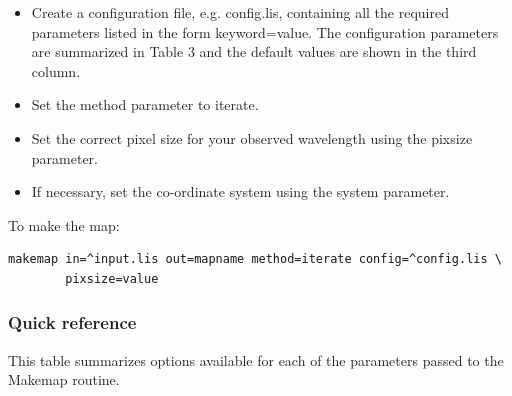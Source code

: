 \documentclass[twoside,11pt]{article}
\renewcommand{\_}{\texttt{\symbol{95}}}
\begin{document}
\begin{itemize}
\item Create a configuration file, e.g. config.lis, containing all the
  required parameters listed in the form keyword=value. The
  configuration parameters are summarized in Table 3 and the default
  values are shown in the third column.
\item Set the method parameter to iterate.
\item Set the correct pixel size for your observed wavelength using
  the pixsize parameter.
\item If necessary, set the co-ordinate system using the system
  parameter.
\end{itemize}

To make the map:
\begin{verbatim}
makemap in=^input.lis out=mapname method=iterate config=^config.lis \
        pixsize=value
\end{verbatim}


\subsubsection{Quick reference}

This table summarizes options available for each of the parameters
passed to the Makemap routine.
\end{document}
